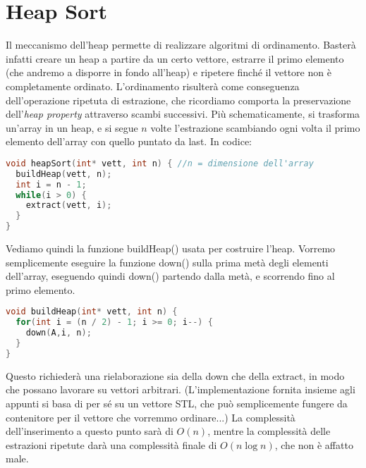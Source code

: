 \documentclass[a4paper,12pt]{article}
\begin{document}
\section{Heap Sort}
Il meccanismo dell'heap permette di realizzare algoritmi di ordinamento. Basterà infatti creare un heap
a partire da un certo vettore, estrarre il primo elemento (che andremo a disporre in fondo all'heap) e ripetere finché
il vettore non è completamente ordinato. L'ordinamento risulterà come conseguenza dell'operazione ripetuta di estrazione,
che ricordiamo comporta la preservazione dell'\textit{heap property} attraverso scambi successivi. Più schematicamente,
si trasforma un'array in un heap, e si segue $n$ volte l'estrazione scambiando ogni volta il primo elemento dell'array
con quello puntato da last. In codice:
\begin{lstlisting}[language=C++]
void heapSort(int* vett, int n) { //n = dimensione dell'array
  buildHeap(vett, n);
  int i = n - 1;
  while(i > 0) {
    extract(vett, i);
  }
}
\end{lstlisting}
Vediamo quindi la funzione buildHeap() usata per costruire l'heap. Vorremo semplicemente
eseguire la funzione down() sulla prima metà degli elementi dell'array, eseguendo quindi down()
partendo dalla metà, e scorrendo fino al primo elemento. 
\begin{lstlisting}[language=C++]
void buildHeap(int* vett, int n) {
  for(int i = (n / 2) - 1; i >= 0; i--) {
    down(A,i, n);
  }  
}
\end{lstlisting}
Questo richiederà una rielaborazione sia della down che della extract, in modo che possano lavorare su vettori arbitrari. (L'implementazione fornita insieme agli appunti
si basa di per sé su un vettore STL, che può semplicemente fungere da contenitore per il vettore che vorremmo ordinare...)
La complessità dell'inserimento a questo punto sarà di $O(n)$, mentre la complessità delle estrazioni ripetute darà una complessità finale
di $O(n\log{n})$, che non è affatto male.\\
\end{document}
